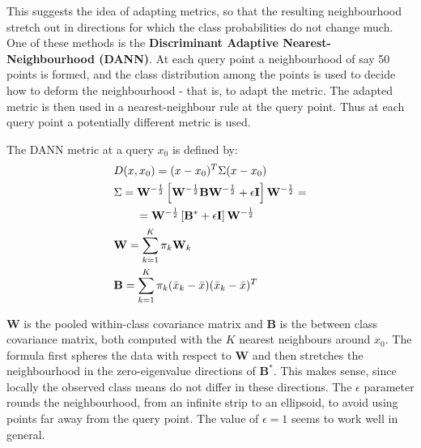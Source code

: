 This suggests the idea of adapting metrics, so that the resulting neighbourhood stretch out in directions for which the class probabilities do not change much. One of these methods is the \textbf{Discriminant Adaptive Nearest-Neighbourhood (DANN)}. 
At each query point a neighbourhood of say 50 points is formed, and the class distribution among the points is used to decide how to deform the neighbourhood - that is, to adapt the metric. The adapted metric is then used in a nearest-neighbour rule at the query point. Thus at each query point a potentially different metric is used.

The DANN metric at a query $x_0$ is defined by:
\begin{equation}
\begin{aligned}
&D(x,x_0) = (x-x_0)^T\Sigma (x-x_0)\\
&\Sigma = \mathbf{W}^{-\frac{1}{2}} \left[ \mathbf{W}^{-\frac{1}{2}}\mathbf{B}\mathbf{W}^{-\frac{1}{2}} + \epsilon \mathrm{\mathbf{I}} \right] \mathbf{W}^{-\frac{1}{2}} = \\
&\quad\quad = \mathbf{W}^{-\frac{1}{2}}\left[ \mathbf{B}^*+\epsilon\mathrm{\mathbf{I}}\right] \mathbf{W}^{-\frac{1}{2}}\\
&\mathbf{W} = \sum_{k=1}^K \pi_k  \mathbf{W}_k\\
& \mathbf{B} = \sum_{k=1}^K \pi_k  (\bar{x}_k - \bar{x})(\bar{x}_k - \bar{x})^T
\end{aligned}
\end{equation}

$ \mathbf{W}$ is the pooled within-class covariance matrix and $\mathbf{B}$ is the between class covariance matrix, both computed with the $K$ nearest neighbours around $x_0$.
The formula first spheres the data with respect to $\mathbf{W}$ and then stretches the neighbourhood in the zero-eigenvalue directions of $\mathbf{B}^*$.
This makes sense, since locally the observed class means do not differ in these directions. The $\epsilon$ parameter rounds the neighbourhood, from an infinite strip to an ellipsoid, to avoid using points far away from the query point. The value of $\epsilon = 1$ seems to work well in general.

